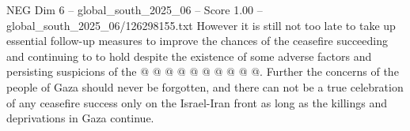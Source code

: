 \begin{textsample}{NEG Dim 6 – global\_south\_2025\_06 – Score 1.00 – global\_south\_2025\_06/126298155.txt}
However it is still not too late to take up essential follow-up measures to improve the chances of the ceasefire succeeding and continuing to to hold despite the existence of some adverse factors and persisting suspicions of the @ @ @ @ @ @ @ @ @ @.
Further the concerns of the people of Gaza should never be forgotten, and there can not be a true celebration of any ceasefire success only on the Israel-Iran front as long as the killings and deprivations in Gaza continue.

\end{textsample}
